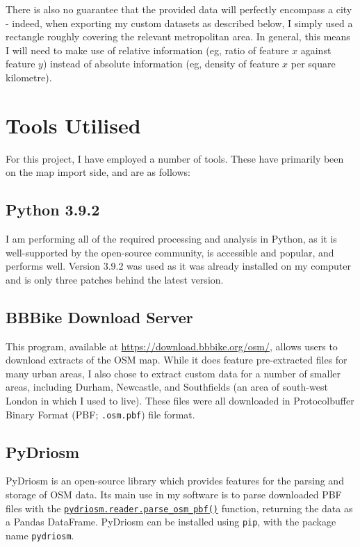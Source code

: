 \documentclass[11pt]{article} %
\begin{document}
There is also no guarantee that the provided data will perfectly encompass a city - indeed, when exporting my custom datasets as described below, I simply used a rectangle roughly covering the relevant metropolitan area. In general, this means I will need to make use of relative information (eg, ratio of feature $x$ against feature $y$) instead of absolute information (eg, density of feature $x$ per square kilometre).


\section{Tools Utilised}
For this project, I have employed a number of tools. These have primarily been on the map import side, and are as follows:

\subsection{Python 3.9.2}
I am performing all of the required processing and analysis in Python, as it is well-supported by the open-source community, is accessible and popular, and performs well. Version 3.9.2 was used as it was already installed on my computer and is only three patches behind the latest version.

\subsection{BBBike Download Server}
This program, available at \href{https://download.bbbike.org/osm/}{https://download.bbbike.org/osm/}, allows users to download extracts of the OSM map. While it does feature pre-extracted files for many urban areas, I also chose to extract custom data for a number of smaller areas, including Durham, Newcastle, and Southfields (an area of south-west London in which I used to live). These files were all downloaded in Protocolbuffer Binary Format (PBF; \texttt{.osm.pbf}) file format.

\subsection{PyDriosm}
PyDriosm is an open-source library which provides features for the parsing and storage of OSM data. Its main use in my software is to parse downloaded PBF files with the \href{https://pydriosm.readthedocs.io/en/latest/_generated/pydriosm.reader.parse_osm_pbf.html}{\texttt{pydriosm.reader.parse\_osm\_pbf()}} function, returning the data as a Pandas DataFrame. PyDriosm can be installed using \texttt{pip}, with the package name \texttt{pydriosm}.
\end{document}
